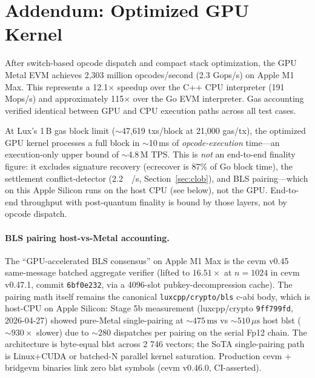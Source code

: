 \section*{Addendum: Optimized GPU Kernel}

After switch-based opcode dispatch and compact stack optimization,
the GPU Metal EVM achieves 2,303 million opcodes/second (2.3 Gops/s)
on Apple M1 Max. This represents a 12.1$\times$ speedup over the
C++ CPU interpreter (191 Mops/s) and approximately 115$\times$ over
the Go EVM interpreter. Gas accounting verified identical between
GPU and CPU execution paths across all test cases.

At Lux's 1\,B gas block limit ($\sim$47{,}619 txs/block at 21{,}000 gas/tx),
the optimized GPU kernel processes a full block in $\sim$10\,ms of
\emph{opcode-execution} time---an execution-only upper bound of $\sim$4.8\,M TPS.
This is \emph{not} an end-to-end finality figure: it excludes signature
recovery (ecrecover is 87\% of Go block time), the settlement
conflict-detector (\SI{2.2}{\mega{}/\second},
Section~\ref{sec:clob}), and BLS pairing---which on this Apple Silicon runs on
the host CPU (see below), not the GPU. End-to-end throughput with post-quantum
finality is bound by those layers, not by opcode dispatch.

\paragraph{BLS pairing host-vs-Metal accounting.}
The ``GPU-accelerated BLS consensus'' on Apple M1 Max is the
cevm v0.45 same-message batched aggregate verifier (lifted to
$16.51\times$ at $n{=}1024$ in cevm v0.47.1, commit \texttt{6bf0e232},
via a 4096-slot pubkey-decompression cache). The pairing math
itself remains the canonical \texttt{luxcpp/crypto/bls} c-abi body,
which is host-CPU on Apple Silicon: Stage 5b measurement
(luxcpp/crypto \texttt{9ff799fd}, 2026-04-27) showed pure-Metal
single-pairing at ${\sim}475\,\text{ms}$ vs ${\sim}510\,\mu\text{s}$
host blst (${\sim}930\times$ slower) due to ${\sim}280$ dispatches
per pairing on the serial Fp12 chain. The architecture is byte-equal
blst across 2 746 vectors; the SoTA single-pairing path is Linux+CUDA
or batched-N parallel kernel saturation. Production cevm + bridgevm
binaries link zero blst symbols (cevm v0.46.0, CI-asserted).

